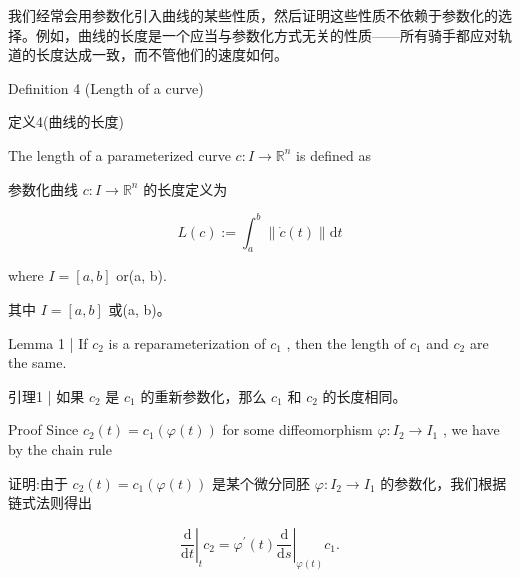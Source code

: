 \begin{tcolorbox}
我们经常会用参数化引入曲线的某些性质，然后证明这些性质不依赖于参数化的选择。例如，曲线的长度是一个应当与参数化方式无关的性质——所有骑手都应对轨道的长度达成一致，而不管他们的速度如何。
\end{tcolorbox}

\HRule

Definition 4 (Length of a curve)

\begin{tcolorbox}
定义4(曲线的长度)
\end{tcolorbox}

\HRule

The length of a parameterized curve \(c : I \rightarrow  {\mathbb{R}}^{n}\) is defined as

\begin{tcolorbox}
参数化曲线 \(c : I \rightarrow  {\mathbb{R}}^{n}\) 的长度定义为
\end{tcolorbox}

\[
L\left( c\right)  \mathrel{\text{ := }} {\int }_{a}^{b}\parallel \dot{c}\left( t\right) \parallel \mathrm{d}t \tag{1.1}
\]

where \(I = \left\lbrack  {a,b}\right\rbrack\) or(a, b).

\begin{tcolorbox}
其中 \(I = \left\lbrack  {a,b}\right\rbrack\) 或(a, b)。
\end{tcolorbox}

Lemma 1 | If \({c}_{2}\) is a reparameterization of \({c}_{1}\) , then the length of \({c}_{1}\) and \({c}_{2}\) are the same.

\begin{tcolorbox}
引理1 | 如果 \({c}_{2}\) 是 \({c}_{1}\) 的重新参数化，那么 \({c}_{1}\) 和 \({c}_{2}\) 的长度相同。
\end{tcolorbox}

Proof Since \({c}_{2}\left( t\right)  = {c}_{1}\left( {\varphi \left( t\right) }\right)\) for some diffeomorphism \(\varphi  : {I}_{2} \rightarrow  {I}_{1}\) , we have by the chain rule

\begin{tcolorbox}
证明:由于 \({c}_{2}\left( t\right)  = {c}_{1}\left( {\varphi \left( t\right) }\right)\) 是某个微分同胚 \(\varphi  : {I}_{2} \rightarrow  {I}_{1}\) 的参数化，我们根据链式法则得出
\end{tcolorbox}

\[
{\left. \frac{\mathrm{d}}{\mathrm{d}t}\right| }_{t}{c}_{2} = {\left. {\varphi }^{\prime }\left( t\right) \frac{\mathrm{d}}{\mathrm{d}s}\right| }_{\varphi \left( t\right) }{c}_{1}.
\]

